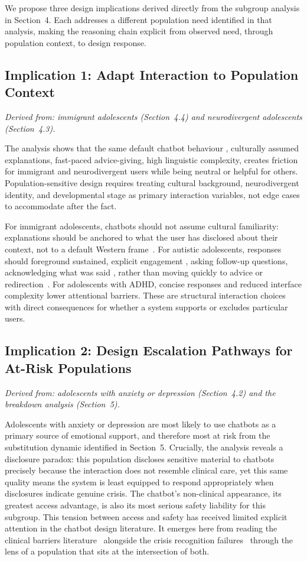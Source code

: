 \documentclass[manuscript]{acmart}
\begin{document}
We propose three design implications derived directly from the subgroup analysis in
Section~4. Each addresses a different population need identified in that analysis, making
the reasoning chain explicit from observed need, through population context, to design response.

\subsection{Implication 1: Adapt Interaction to Population Context}

\textit{Derived from: immigrant adolescents (Section~4.4) and neurodivergent adolescents
(Section~4.3).} 

The analysis shows that the same default chatbot behaviour , culturally assumed explanations,
fast-paced advice-giving, high linguistic complexity, creates friction for immigrant and
neurodivergent users while being neutral or helpful for others. Population-sensitive design
requires treating cultural background, neurodivergent identity, and developmental stage as
primary interaction variables, not edge cases to accommodate after the fact. 

For immigrant adolescents, chatbots should not assume cultural familiarity: explanations
should be anchored to what the user has disclosed about their context, not to a default
Western frame~\cite{Tozadore2026}. For autistic adolescents, responses should foreground
sustained, explicit engagement , asking follow-up questions, acknowledging what was said ,
rather than moving quickly to advice or redirection~\cite{LisboaWhite2024}. For adolescents
with ADHD, concise responses and reduced interface complexity lower attentional barriers.
These are structural interaction choices with direct consequences for whether a system
supports or excludes particular users.

\subsection{Implication 2: Design Escalation Pathways for At-Risk Populations}

\textit{Derived from: adolescents with anxiety or depression (Section~4.2) and the
breakdown analysis (Section~5).} 

Adolescents with anxiety or depression are most likely to use chatbots as a primary source
of emotional support, and therefore most at risk from the substitution dynamic identified in
Section~5. Crucially, the analysis reveals a disclosure paradox: this population
discloses sensitive material to chatbots precisely because the interaction does not
resemble clinical care, yet this same quality means the system is least equipped to respond
appropriately when disclosures indicate genuine crisis. The chatbot's non-clinical appearance,
its greatest access advantage, is also its most serious safety liability for this subgroup.
This tension between access and safety has received limited explicit attention in the chatbot
design literature. It emerges here from reading the clinical barriers
literature~\cite{kuhlmeier2025designing} alongside the crisis recognition
failures~\cite{hipgrave2025balancing,BBC2025} through the lens of a population that sits
at the intersection of both. 
\end{document}
